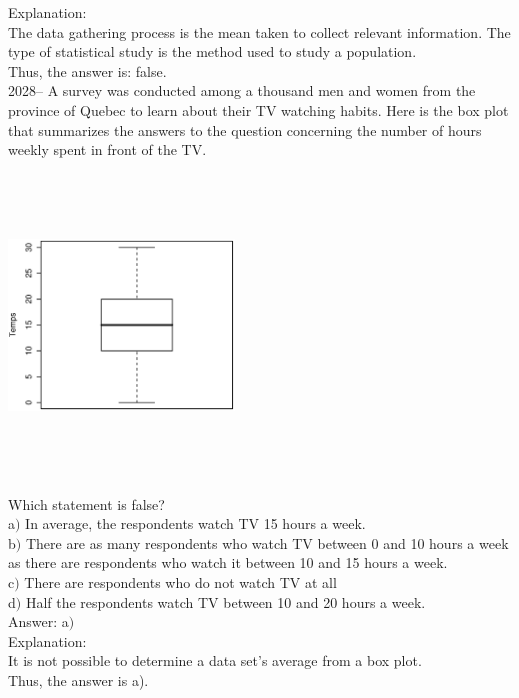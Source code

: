 \documentclass[letterpaper, 12pt]{article}
\begin{document}
Explanation:\\
The data gathering process is the mean taken to collect relevant information. The type of statistical study is the method used to study a population.\\
Thus, the answer is: false.\\


2028-- A survey was conducted among a thousand men and women from
the province of Quebec to learn about their TV watching habits. Here
is the box plot that summarizes the answers to the question
concerning the number of hours weekly spent in front of the TV.
\begin{center}
 \includegraphics[width=6cm,height=8cm,angle=-90]{Q2028.eps}
\end{center}

Which statement is false?\\

a$)$ In average, the respondents watch TV 15 hours a week.\\
b$)$ There are as many respondents who watch TV between 0 and 10 hours a week as there are respondents who watch it between 10 and 15 hours a week.\\
c$)$ There are respondents who do not watch TV at all\\
d$)$ Half the respondents watch TV between 10 and 20 hours a week.\\

Answer: a$)$\\

Explanation:\\
It is not possible to determine a data set's average from a box plot.\\
Thus, the answer is a).\\
\end{document}
